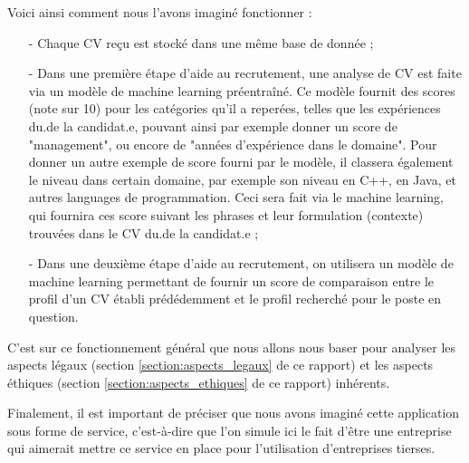 Voici ainsi comment nous l'avons imaginé fonctionner : 

\begin{enumerate}
    \item[-] Chaque CV reçu est stocké dans une même base de donnée ;
    \item[-] Dans une première étape d'aide au recrutement, une analyse de CV est faite via un modèle de machine learning préentraîné. Ce modèle fournit des scores (note sur 10) pour les catégories qu'il a reperées, telles que les expériences du.de la candidat.e, pouvant ainsi par exemple donner un score de "management", ou encore de "années d'expérience dans le domaine". Pour donner un autre exemple de score fourni par le modèle, il classera également le niveau dans certain domaine, par exemple son niveau en C++, en Java, et autres languages de programmation. Ceci sera fait via le machine learning, qui fournira ces score suivant les phrases et leur formulation (contexte) trouvées dans le CV du.de la candidat.e ;
    \item[-] Dans une deuxième étape d'aide au recrutement, on utilisera un modèle de machine learning permettant de fournir un score de comparaison entre le profil d'un CV établi prédédemment et le profil recherché pour le poste en question.
\end{enumerate}

C'est sur ce fonctionnement général que nous allons nous baser pour analyser les aspects légaux (section \ref{section:aspects_legaux} de ce rapport) et les aspects éthiques (section \ref{section:aspects_ethiques} de ce rapport) inhérents.\newline

Finalement, il est important de préciser que nous avons imaginé cette application sous forme de service, c'est-à-dire que l'on simule ici le fait d'être une entreprise qui aimerait mettre ce service en place pour l'utilisation d'entreprises tierses.
